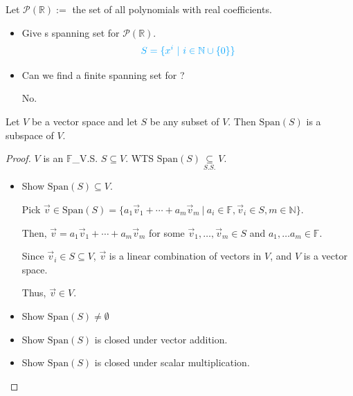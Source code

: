 \documentclass[11pt,fleqn]{book} %
\begin{document}
\begin{example}
    Let $\mathcal{P}(\mathbb{R}):=$ the set of all polynomials with real coefficients. 

    \begin{itemize}
        \item Give s spanning set for $\mathcal{P}(\mathbb{R})$. 
        $$\color{lightblue} S = \{ x^i ~|~ i \in \mathbb{N} \cup \{0\} \} $$
        
        \vspace{-0.5cm}
        \item Can we find a finite spanning set for ? 

        {\color{lightblue} No. }
    \end{itemize}
\end{example}

\setcounter{dummy}{3}
\begin{theorem}
    Let $V$ be a vector space and let $S$ be any subset of $V$. Then $\mathrm{Span}(S)$ is a subspace of $V$.
\end{theorem}

\begin{proof}
    $V$ is an $\mathbb{F}$\_V.S. $S \subseteq V$. WTS $\mathrm{Span}(S) \underset{S.S.}{\subseteq} V$. 
    
    \begin{itemize}
        \item Show $\mathrm{Span}(S) \subseteq V$. 
        
        Pick $\vec{v} \in \mathrm{Span}\left( S \right) = \{ a_1\vec{v}_1 + \cdots + a_m\vec{v}_m ~|~ a_i \in \mathbb{F}, \vec{v}_i \in S, m \in \mathbb{N} \}$. 
        
        Then, $\vec{v} = a_1\vec{v}_1 + \cdots + a_m\vec{v}_m$ for some $\vec{v}_1, \dots, \vec{v}_m \in S$ and $a_1,\dots a_m  \in \mathbb{F}$. 
        
        Since $\vec{v}_i \in S \subseteq V$, $\vec{v}$ is a linear combination of vectors in $V$, and $V$ is a vector space. 
        
        Thus, $\vec{v} \in V$. 
        
        \item Show $\mathrm{Span}(S) \neq \emptyset$

        \item Show $\mathrm{Span}(S)$ is closed under vector addition. 

        \item Show $\mathrm{Span}(S)$ is closed under scalar multiplication. 
    \end{itemize}
\end{proof}
\end{document}
